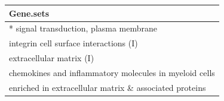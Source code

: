 \begin{tabular}{l}
  \hline
Gene.sets \\ 
  \hline
* signal transduction, plasma membrane \\ 
  integrin cell surface interactions (I) \\ 
  extracellular matrix (I) \\ 
  chemokines and inflammatory molecules in myeloid cells \\ 
  enriched in extracellular matrix \& associated proteins \\ 
   \hline
\end{tabular}
